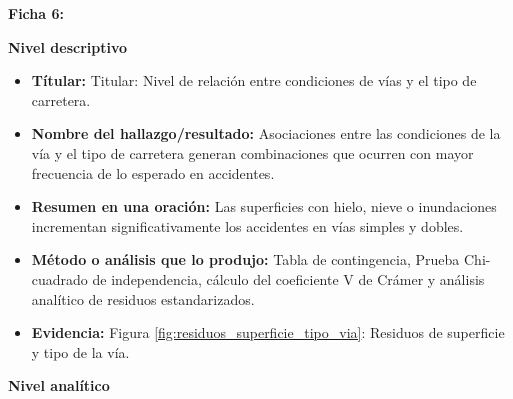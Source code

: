 \documentclass[12pt]{article}
\begin{document}
\textbf{Ficha 6:}

\textbf{Nivel descriptivo}
\begin{itemize}
    \item \textbf{Títular:} Titular: Nivel de relación entre condiciones de vías 
    y el tipo de carretera.
    
    \item \textbf{Nombre del hallazgo/resultado:} Asociaciones entre las condiciones
    de la vía y el tipo de carretera generan combinaciones que ocurren con mayor
    frecuencia de lo esperado en accidentes.  

    
    \item \textbf{Resumen en una oración:}  Las superficies con hielo, nieve o 
    inundaciones incrementan significativamente los accidentes en vías simples y dobles.

    
    \item \textbf{Método o análisis que lo produjo:} Tabla de contingencia,
    Prueba Chi-cuadrado de independencia, cálculo del coeficiente V de Crámer 
    y análisis analítico de residuos estandarizados.

    
    \item \textbf{Evidencia:} Figura \ref{fig:residuos_superficie_tipo_via}: Residuos
    de superficie y tipo de la vía.\\
    

\end{itemize}

\textbf{Nivel analítico}
\end{document}
